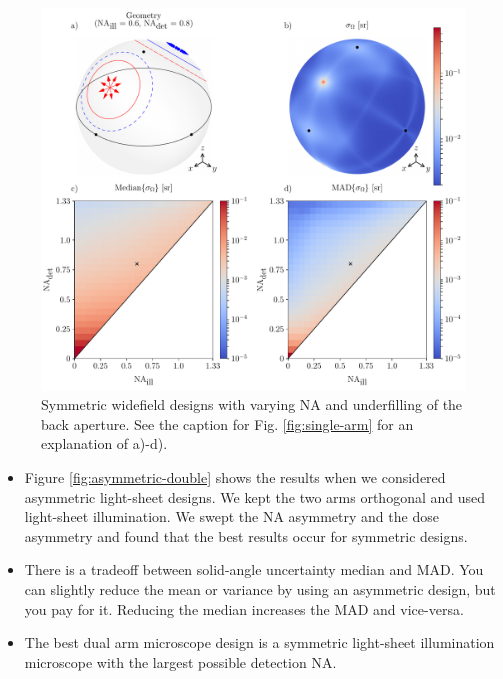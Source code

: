 \documentclass[10pt]{article}
\begin{document}
\begin{figure}[htbp]
\centering\includegraphics[width=\textwidth]{double-arm}
\caption{Symmetric widefield designs with varying NA and underfilling of the
  back aperture. See the caption for Fig. \ref{fig:single-arm} for an
  explanation of a)-d).}
\label{fig:double-arm}
\end{figure}

\begin{itemize}
\item Figure \ref{fig:asymmetric-double} shows the results when we considered
  asymmetric light-sheet designs. We kept the two arms orthogonal and used light-sheet
  illumination. We swept the NA asymmetry and the dose asymmetry and found that the
  best results occur for symmetric designs. 
\item There is a tradeoff between solid-angle uncertainty median and MAD. You
  can slightly reduce the mean or variance by using an asymmetric design, but
  you pay for it. Reducing the median increases the MAD and vice-versa.
\item The best dual arm microscope design is a symmetric light-sheet
  illumination microscope with the largest possible detection NA.
\end{itemize}
\end{document}
